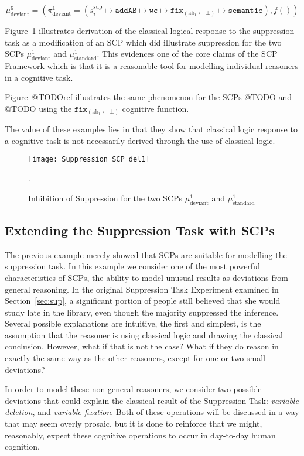 \[\mu^6_\text{deviant}=(\pi^1_\text{deviant}=(s_i^{\text{sup}} \longmapsto \texttt{addAB} \longmapsto \texttt{wc} \longmapsto \texttt{fix}_{(\text{ab}_1\leftarrow \bot)} \longmapsto \texttt{semantic}),f())\]

Figure~\ref{fig:Suppression_SCP_del1} illustrates derivation of the classical logical response to the suppression task as a modification of an SCP which did illustrate suppression for the two SCPs $\mu^1_\text{deviant}$ and $\mu^1_\text{standard}$. This evidences one of the core claims of the SCP Framework which is that it is a reasonable tool for modelling individual reasoners in a cognitive task. 

Figure~@TODOref illustrates the same phenomenon for the SCPs @TODO and @TODO using the $\texttt{fix}_{(\text{ab}_1\leftarrow \bot)}$ cognitive function.

The value of these examples lies in that they show that classical logic response to a cognitive task is not necessarily derived through the use of classical logic.

\begin{figure}
\centering \texttt{[image: Suppression\_SCP\_del1]}
\caption{Inhibition of Suppression for the two SCPs $\mu^1_\text{deviant}$ and $\mu^1_\text{standard}$}.
\label{fig:Suppression_SCP_del1}
\end{figure}



\subsection{Extending the Suppression Task with SCPs}
The previous example merely showed that SCPs are suitable for modelling the suppression task. In this example we consider one of the most powerful characteristics of SCPs, the ability to model unusual results as deviations from general reasoning. In the original Suppression Task Experiment examined in Section~\ref{sec:sup}, a significant portion of people still believed that she would study late in the library, even though the majority suppressed the inference. Several possible explanations are intuitive, the first and simplest, is the assumption that the reasoner is using classical logic and drawing the classical conclusion. However, what if that is not the case? What if they do reason in exactly the same way as the other reasoners, except for one or two small deviations?

In order to model these non-general reasoners, we consider two possible deviations that could explain the classical result of the Suppression Task: \textit{variable deletion}, and\textit{ variable fixation}. Both of these operations will be discussed in a way that may seem overly prosaic, but it is done to reinforce that we might, reasonably, expect these cognitive operations to occur in day-to-day human cognition.


